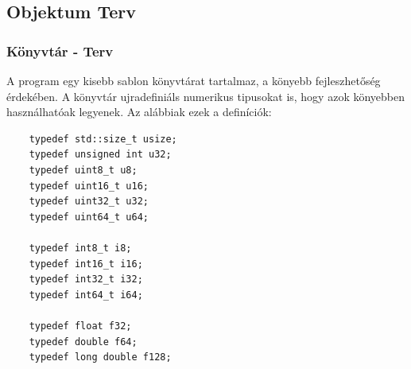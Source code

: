 \documentclass{article}[12pt,a4paper]
\begin{document}
    \subsection{Objektum Terv}

    \subsubsection{Könyvtár - Terv}
    A program egy kisebb sablon könyvtárat tartalmaz, a könyebb fejleszhetőség érdekében.
    A könyvtár ujradefiniáls numerikus tipusokat is, hogy azok könyebben használhatóak legyenek.
    Az alábbiak ezek a definíciók:
    \begin{lstlisting}
    typedef std::size_t usize;
    typedef unsigned int u32;
    typedef uint8_t u8;
    typedef uint16_t u16;
    typedef uint32_t u32;
    typedef uint64_t u64;

    typedef int8_t i8;
    typedef int16_t i16;
    typedef int32_t i32;
    typedef int64_t i64;

    typedef float f32;
    typedef double f64;
    typedef long double f128;
    \end{lstlisting}
\end{document}
